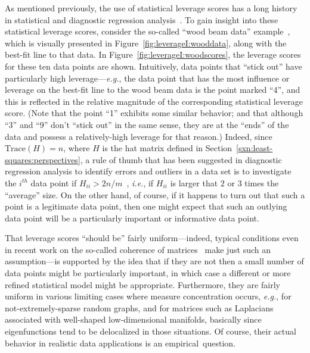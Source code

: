 \documentclass[twoside]{article}
\begin{document}
As mentioned previously, the use of statistical leverage scores has a long
history in statistical and diagnostic regression 
analysis~\cite{HW78,ChatterjeeHadi88,CH86,VW81,ChatterjeeHadiPrice00}. 
To gain insight into these statistical leverage scores, consider the 
so-called ``wood beam data'' example~\cite{DS66,HW78}, which is visually 
presented in Figure~\ref{fig:leverageI:wooddata}, along with the best-fit 
line to that data. 
In Figure~\ref{fig:leverageI:woodscores}, the leverage scores for these ten 
data points are shown.
Intuitively, data points that ``stick out'' have particularly high 
leverage---\emph{e.g.}, the data point that has the most influence or 
leverage on the best-fit line to the wood beam data is the point marked 
``4'', and this is reflected in the relative magnitude of the corresponding 
statistical leverage score.
(Note that the point ``1'' exhibits some similar behavior; and that although 
``3'' and ``9'' don't ``stick out'' in the same sense, they are at the 
``ends'' of the data and possess a relatively-high leverage for that reason.)
Indeed, since $\mbox{Trace}(H)=n$, where $H$ is the hat matrix defined in 
Section~\ref{sxn:least-squares:perspectives}, 
a rule of thumb that has been suggested in
diagnostic regression analysis to identify errors and outliers in a data 
set is to investigate the $i^{th}$ data point if 
$H_{ii} > 2n/m$~\cite{VW81,ChatterjeeHadiPrice00}, 
\emph{i.e.}, if $H_{ii}$ is larger that $2$ or $3$ times the ``average'' 
size.
On the other hand, of course, if it happens to turn out that such a point is 
a legitimate data point, 
then one might expect that such an outlying data point will be a 
particularly important or informative data point.

That leverage scores ``should be'' fairly uniform---indeed, typical 
conditions even in recent work on the so-called coherence of 
matrices~\cite{CR07,CSPW11,AMT10,TalRos10} make just such an 
assumption---is supported by the idea that if they are not then a small 
number of data points might be particularly important, in which case a 
different or more refined statistical model might be appropriate.
Furthermore, they are fairly uniform in various limiting cases where 
measure concentration occurs, \emph{e.g.}, for not-extremely-sparse 
random graphs, and for matrices such as Laplacians associated with 
well-shaped low-dimensional manifolds, basically since eigenfunctions tend 
to be delocalized in those situations.
Of course, their actual behavior in realistic data applications is an 
empirical~question.
\end{document}
